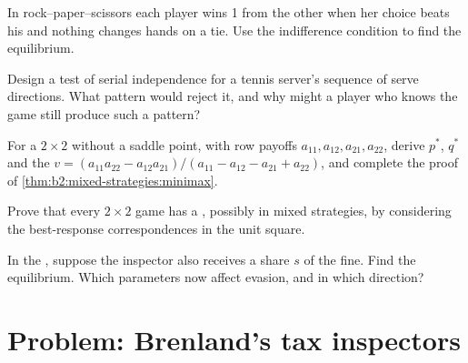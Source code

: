 \begin{exercise}[$\star\star$]\label{exo:b2:mixed-strategies:8}
In rock--paper--scissors each player wins 1 from the other when her choice beats his and nothing changes hands
on a tie. Use the indifference condition to find the equilibrium.
\end{exercise}

\begin{exercise}[$\star\star$]\label{exo:b2:mixed-strategies:9}
Design a test of serial independence for a tennis server's sequence of serve directions. What pattern would
reject it, and why might a player who knows the game still produce such a pattern?
\end{exercise}

\begin{exercise}[$\star\star\star$]\label{exo:b2:mixed-strategies:10}
For a $2 \times 2$  without a saddle point, with row payoffs $a_{11}, a_{12}, a_{21}, a_{22}$, derive
$p^*$, $q^*$ and the  $v = (a_{11}a_{22} - a_{12}a_{21})/(a_{11} - a_{12} - a_{21} + a_{22})$, and complete the proof
of \cref{thm:b2:mixed-strategies:minimax}.
\end{exercise}

\begin{exercise}[$\star\star\star$]\label{exo:b2:mixed-strategies:11}
Prove that every $2 \times 2$ game has a , possibly in mixed strategies, by considering the
best-response correspondences in the unit square.
\end{exercise}

\begin{exercise}[$\star\star\star$]\label{exo:b2:mixed-strategies:12}
In the , suppose the inspector also receives a share $s$ of the fine. Find the equilibrium. Which
parameters now affect evasion, and in which direction?
\end{exercise}

\section{Problem: Brenland's tax inspectors}\label{sec:b2:mixed-strategies:problem}

